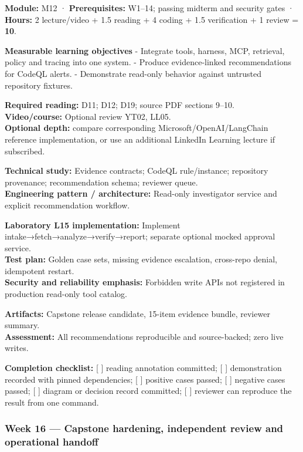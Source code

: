 \documentclass[
  10pt,
]{article}
\begin{document}
\textbf{Module:} M12 · \textbf{Prerequisites:} W1--14; passing midterm
and security gates · \textbf{Hours:} 2 lecture/video + 1.5 reading + 4
coding + 1.5 verification + 1 review = \textbf{10}.

\textbf{Measurable learning objectives} - Integrate tools, harness, MCP,
retrieval, policy and tracing into one system. - Produce evidence-linked
recommendations for CodeQL alerts. - Demonstrate read-only behavior
against untrusted repository fixtures.

\textbf{Required reading:} D11; D12; D19; source PDF sections 9--10.\\
\textbf{Video/course:} Optional review YT02, LL05.\\
\textbf{Optional depth:} compare corresponding
Microsoft/OpenAI/LangChain reference implementation, or use an
additional LinkedIn Learning lecture if subscribed.

\textbf{Technical study:} Evidence contracts; CodeQL rule/instance;
repository provenance; recommendation schema; reviewer queue.\\
\textbf{Engineering pattern / architecture:} Read-only investigator
service and explicit recommendation workflow.

\textbf{Laboratory L15 implementation:} Implement
intake→fetch→analyze→verify→report; separate optional mocked approval
service.\\
\textbf{Test plan:} Golden case sets, missing evidence escalation,
cross-repo denial, idempotent restart.\\
\textbf{Security and reliability emphasis:} Forbidden write APIs not
registered in production read-only tool catalog.

\textbf{Artifacts:} Capstone release candidate, 15-item evidence bundle,
reviewer summary.\\
\textbf{Assessment:} All recommendations reproducible and source-backed;
zero live writes.

\textbf{Completion checklist:} {[} {]} reading annotation committed; {[}
{]} demonstration recorded with pinned dependencies; {[} {]} positive
cases passed; {[} {]} negative cases passed; {[} {]} diagram or decision
record committed; {[} {]} reviewer can reproduce the result from one
command.

\subsubsection{Week 16 --- Capstone hardening, independent review and
operational
handoff}\label{week-16-capstone-hardening-independent-review-and-operational-handoff}
\end{document}
